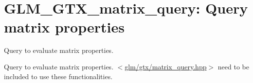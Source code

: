 \hypertarget{group__gtx__matrix__query}{\section{\-G\-L\-M\-\_\-\-G\-T\-X\-\_\-matrix\-\_\-query\-: \-Query matrix properties}
\label{group__gtx__matrix__query}
}


\-Query to evaluate matrix properties.  


\-Query to evaluate matrix properties. $<$\hyperlink{matrix__query_8hpp}{glm/gtx/matrix\-\_\-query.\-hpp}$>$ need to be included to use these functionalities. 